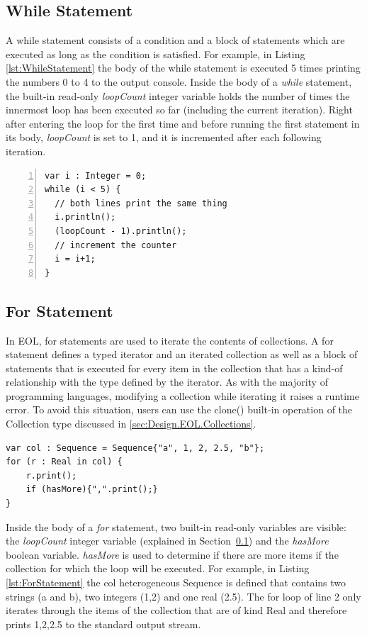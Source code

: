 \subsection{While Statement}
\label{sec:while-statement}

A while statement consists of a condition and a block of statements which are executed as long as the condition is satisfied. For example, in Listing \ref{lst:WhileStatement} the body of the while statement is executed 5 times printing the numbers 0 to 4 to the output console. Inside the body of a \emph{while} statement, the built-in read-only \emph{loopCount} integer variable holds the number of times the innermost loop has been executed so far (including the current iteration). Right after entering the loop for the first time and before running the first statement in its body, \emph{loopCount} is set to 1, and it is incremented after each following iteration.

\begin{lstlisting}[float=h, caption=Example of a while statement, label=lst:WhileStatement, numbers=left, language=EOL]
var i : Integer = 0;
while (i < 5) {
  // both lines print the same thing
  i.println();
  (loopCount - 1).println();
  // increment the counter
  i = i+1;
}
\end{lstlisting}

\subsection{For Statement}

In EOL, for statements are used to iterate the contents of collections. A for statement defines a typed iterator and an iterated collection as well as a block of statements that is executed for every item in the collection that has a kind-of relationship with the type defined by the iterator. As with the majority of programming languages, modifying a collection while iterating it raises a runtime error. To avoid this situation, users can use the clone() built-in operation of the Collection type discussed in \ref{sec:Design.EOL.Collections}. 

\begin{lstlisting}[float=h, caption=Example of a for statement, label=lst:ForStatement, language=EOL]
var col : Sequence = Sequence{"a", 1, 2, 2.5, "b"};
for (r : Real in col) {
	r.print();
	if (hasMore){",".print();}
}
\end{lstlisting}

Inside the body of a \emph{for} statement, two built-in read-only variables are visible: the \emph{loopCount} integer variable (explained in Section~\ref{sec:while-statement}) and the \emph{hasMore} boolean variable. \emph{hasMore} is used to determine if there are more items if the collection for which the loop will be executed. For example, in Listing \ref{lst:ForStatement} the col heterogeneous Sequence is defined that contains two strings (a and b), two integers (1,2) and one real (2.5). The for loop of line 2 only iterates through the items of the collection that are of kind Real and therefore prints 1,2,2.5 to the standard output stream.

